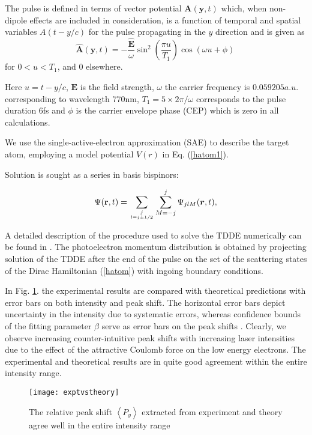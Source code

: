 \documentclass[aps,prl,twocolumn,superscriptaddress,amsmath,amssymb]{revtex4-1}
\begin{document}
The pulse is defined in terms of vector potential $\bm A (\bm y,t)$ which, when non-dipole effects are included in consideration,  is a function of temporal and spatial variables $A(t-y/c)$ for the pulse propagating in the $y$ direction and is  given as 
\begin{equation}
\bm \hat {A}(\bm y,t)= -\frac{\hat {\bm {E}}}{\omega}\sin^2(\frac{\pi u}{T_1})\cos(\omega u+\phi) \,
\label{hatom1}
\end{equation}
for $0 < u < T_1$, and 0 elsewhere.

Here $u=t-y/c$,  $\bm {E}$ is the field strength, $\omega$ the carrier frequency is $0.059205 a.u.$ corresponding to wavelength 770nm, $T_1=5\times 2\pi/\omega$ corresponds to the pulse duration 6fs  and $\phi$ is the carrier envelope phase (CEP) which is zero in all calculations. 

We use the single-active-electron approximation (SAE) to describe the target atom, employing a model potential $V(r)$ \cite{oep} in Eq. (\ref{hatom1}).

Solution is sought as a series in basis bispinors:

%
\begin{equation}
\Psi(\mathbf{r},t)=
\sum\limits_{j\atop l=j\pm 1/2} \sum\limits_{M=-j}^{j} 
\Psi_{jlM}({\bm r},t),
\label{basis}
\end{equation}

A detailed description of the procedure used to solve the TDDE numerically can be found in \cite{Ivanov2015}. The photoelectron momentum distribution is obtained by projecting solution of the TDDE after the end of the pulse on the set of the scattering states of the Dirac Hamiltonian (\ref{hatom}) with ingoing boundary conditions.

In Fig. \ref{fig:exptvstheory}. the experimental results are compared with theoretical predictions with error bars on both intensity and peak shift. The horizontal error bars depict uncertainty in the intensity due to systematic errors, whereas confidence bounds of the fitting parameter $\beta$ serve as error bars on the peak shifts . Clearly, we observe increasing counter-intuitive peak shifts with increasing laser intensities due to the effect of the attractive Coulomb force on the low energy electrons. The experimental and theoretical results are in quite good agreement within the entire intensity range.

\begin{figure}[!ht]
\texttt{[image: exptvstheory]}
\caption{\label{fig:exptvstheory}} The relative peak shift $\left\langle P_{y}\right\rangle$ extracted from experiment and theory agree well in the entire intensity range
\end{figure}
\end{document}
